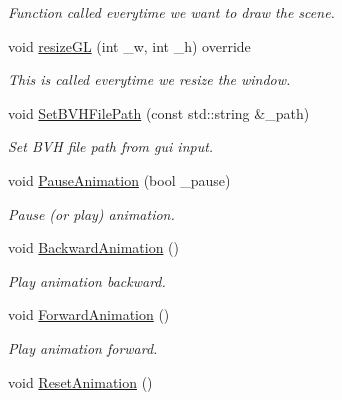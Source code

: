 \begin{DoxyCompactItemize}
\begin{DoxyCompactList}\small\item\em Function called everytime we want to draw the scene. \end{DoxyCompactList}\item 
void \hyperlink{class_n_g_l_scene_a84ad27896b5eccc43fdf1a8fffb507c5}{resize\+GL} (int \+\_\+w, int \+\_\+h) override
\begin{DoxyCompactList}\small\item\em This is called everytime we resize the window. \end{DoxyCompactList}\item 
void \hyperlink{class_n_g_l_scene_a8304f04407d6eadac275b45fce81f651}{Set\+B\+V\+H\+File\+Path} (const std\+::string \&\+\_\+path)
\begin{DoxyCompactList}\small\item\em Set B\+VH file path from gui input. \end{DoxyCompactList}\item 
void \hyperlink{class_n_g_l_scene_a969ca22ec4065faebc584eb15f1eb1e0}{Pause\+Animation} (bool \+\_\+pause)
\begin{DoxyCompactList}\small\item\em Pause (or play) animation. \end{DoxyCompactList}\item 
void \hyperlink{class_n_g_l_scene_ac95e47cdddd4a3b52c0f4fa748337b30}{Backward\+Animation} ()\hypertarget{class_n_g_l_scene_ac95e47cdddd4a3b52c0f4fa748337b30}{}\label{class_n_g_l_scene_ac95e47cdddd4a3b52c0f4fa748337b30}

\begin{DoxyCompactList}\small\item\em Play animation backward. \end{DoxyCompactList}\item 
void \hyperlink{class_n_g_l_scene_a7cae8725893f528f57b86656110a9bf8}{Forward\+Animation} ()\hypertarget{class_n_g_l_scene_a7cae8725893f528f57b86656110a9bf8}{}\label{class_n_g_l_scene_a7cae8725893f528f57b86656110a9bf8}

\begin{DoxyCompactList}\small\item\em Play animation forward. \end{DoxyCompactList}\item 
void \hyperlink{class_n_g_l_scene_ab0d185876d8382166bf8d4240cb10ab3}{Reset\+Animation} ()\hypertarget{class_n_g_l_scene_ab0d185876d8382166bf8d4240cb10ab3}{}\label{class_n_g_l_scene_ab0d185876d8382166bf8d4240cb10ab3}


\end{DoxyCompactItemize}
